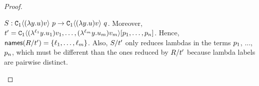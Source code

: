 \begin{proof}
\begin{enumerate}
\begin{enumerate}
        $\redextwo : \con_1\of{(\lam{\vartwo}{\tmthree}) \tmthreevariant} \ \tmfive
          \to \con_1\of{(\lam{\vartwo}{\tmthree}) \tmthreevariant} \ \tmsix$.
        Moreover,
        $t' = \mathtt{C}_1\langle
          (\lambda^{\ell_1} y. u_1) v_1, \hdots,
          (\lambda^{\ell_m} y. u_m) v_m
        \rangle [p_1, \hdots, p_n]$.
        Hence, $\mathsf{names}(R / t') = \{\ell_1, \hdots, \ell_m\}$. Also, $S / t'$
        only reduces lambdas in the terms $p_1$, ..., $p_n$, which must be different
        than the ones reduced by $R / t'$ because lambda labels are pairwise distinct.
    \end{enumerate}
\end{enumerate}
\end{proof}

